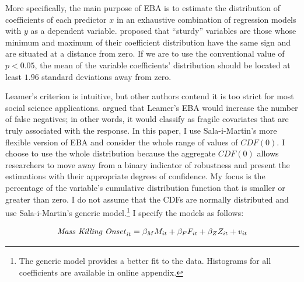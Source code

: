 More specifically, the main purpose of EBA is to estimate the distribution of coefficients of each predictor $x$ in an exhaustive combination of regression models with $y$ as a dependent variable. \cite[308]{leamer1985sensitivity} proposed that ``sturdy'' variables are those whose minimum and maximum of their coefficient distribution have the same sign and are situated at a distance from zero. If we are to use the conventional value of $p < 0.05$, the mean of the variable coefficients' distribution should be located at least $1.96$ standard deviations away from zero. 
	
Leamer's criterion is intuitive, but other authors contend it is too strict for most social science applications. \citet{sala1997just} argued that Leamer's EBA would increase the number of false negatives; in other words, it would classify as fragile covariates that are truly associated with the response. In this paper, I use Sala-i-Martin's more flexible version of EBA and consider the whole range of values of $CDF(0)$. I choose to use the whole distribution because the aggregate $CDF(0)$ allows researchers to move away from a binary indicator of robustness and present the estimations with their appropriate degrees of confidence. My focus is the percentage of the variable's cumulative distribution function that is smaller or greater than zero. I do not assume that the CDFs are normally distributed and use Sala-i-Martin's generic model.\footnote{The generic model provides a better fit to the data. Histograms for all coefficients are available in online appendix.} I specify the models as follows:
	
\begin{equation}
\text{\textit{Mass Killing Onset}}_{it} = \beta_{M}M_{it} + \beta_{F}F_{it} + \beta_{Z}Z_{it} + v_{it}
\end{equation}
	
